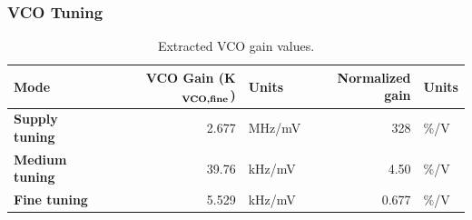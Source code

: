 	\subsubsection{VCO Tuning}\FloatBarrier
		\begin{table}[h!]
			\centering
			\def\arraystretch{1.5}		
			\setlength\arrayrulewidth{0.75pt}
			\setlength{\tabcolsep}{1em} %
			\begin{tabular}{|l|r|l|r|l|}
				\hline 
				\rule[-1ex]{0pt}{2.5ex} \cellcolor{gray!40}\textbf{Mode} & \cellcolor{gray!40}\textbf{VCO Gain (K$_\textnormal{\textbf{VCO,fine}}$)}  & \cellcolor{gray!40}\textbf{Units} & \cellcolor{gray!40}\textbf{Normalized gain}& \cellcolor{gray!40}\textbf{Units}\\ 
				\hline 
				\rule[-1ex]{0pt}{2.5ex} \textbf{Supply tuning}  & 2.677 & MHz/mV & 328 &\%/V\\
				\hline 
				\rule[-1ex]{0pt}{2.5ex} \textbf{Medium tuning}  & 39.76 & kHz/mV  & 4.50 &\%/V\\
				\hline 
				\rule[-1ex]{0pt}{2.5ex} \textbf{Fine tuning}  & 5.529 & kHz/mV & 0.677 & \%/V\\
				\hline 
			\end{tabular} 
			\caption{Extracted VCO gain values.}
			\label{tab:vco_gains}
		\end{table} 

